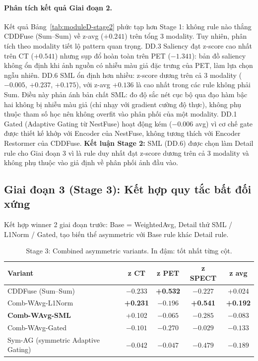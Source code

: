 \paragraph{Phân tích kết quả Giai đoạn 2.}
Kết quả Bảng~\ref{tab:moduleD-stage2} phức tạp hơn Stage 1: không rule nào thắng CDDFuse (Sum--Sum) về z-avg ($+0.241$) trên tổng 3 modality. Tuy nhiên, phân tích theo modality tiết lộ pattern quan trọng. DD.3 Saliency đạt z-score cao nhất trên CT ($+0.541$) nhưng sụp đổ hoàn toàn trên PET ($-1.341$): bản đồ saliency không ổn định khi ảnh nguồn có nhiễu màu giả đặc trưng của PET, làm lựa chọn ngẫu nhiên. DD.6 SML ổn định hơn nhiều: z-score dương trên cả 3 modality ($-0.005$, $+0.237$, $+0.175$), với z-avg $+0.136$ là cao nhất trong các rule không phải Sum. Điều này phản ánh bản chất SML: đo độ sắc nét cục bộ qua đạo hàm bậc hai không bị nhiễu màu giả (chỉ nhạy với gradient cường độ thực), không phụ thuộc tham số học nên không overfit vào phân phối của một modality. DD.1 Gated (Adaptive Gating từ NestFuse) hoạt động kém ($-0.006$ avg) vì cơ chế gate được thiết kế khớp với Encoder của NestFuse, không tương thích với Encoder Restormer của CDDFuse. \textbf{Kết luận Stage 2:} SML (DD.6) được chọn làm Detail rule cho Giai đoạn 3 vì là rule duy nhất đạt z-score dương trên cả 3 modality và không phụ thuộc vào giả định về phân phối ảnh đầu vào.

\subsection{Giai đoạn 3 (Stage 3): Kết hợp quy tắc bất đối xứng}
\label{ssec:ablation-stage3}

Kết hợp winner 2 giai đoạn trước: Base = WeightedAvg, Detail thử SML / L1Norm / Gated, tạo biến thể asymmetric với Base rule khác Detail rule.

\begin{table}[H]
\centering
\small
\caption[Ablation Stage 3: kết hợp bất đối xứng]{Stage 3: Combined asymmetric variants. In đậm: tốt nhất từng cột.}
\label{tab:moduleD-stage3}
\begin{tabular}{lcccc}
\toprule
\textbf{Variant} & \textbf{z CT} & \textbf{z PET} & \textbf{z SPECT} & \textbf{z avg} \\
\midrule
CDDFuse (Sum--Sum)               & $-0.233$ & \textbf{+0.532} & $-0.227$ & +0.024 \\
Comb-WAvg-L1Norm                 & \textbf{+0.231} & $-0.196$ & \textbf{+0.541} & \textbf{+0.192} \\
\textbf{Comb-WAvg-SML}           & +0.102 & $-0.065$ & $-0.285$ & $-0.083$ \\
Comb-WAvg-Gated                  & $-0.101$ & $-0.270$ & $-0.029$ & $-0.133$ \\
Sym-AG (symmetric Adaptive Gating) & $-0.042$ & $-0.047$ & $-0.479$ & $-0.189$ \\
\bottomrule
\end{tabular}
\end{table}

